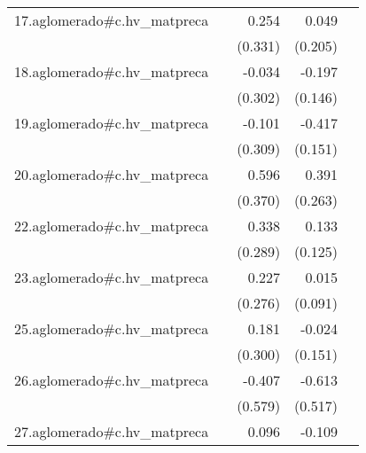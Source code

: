 {\begin{longtable}{l*{4}{D{.}{.}{-1}}}
\addlinespace
17.aglomerado#c.hv\_matpreca&                     &       0.254         &       0.049         &                     \\
            &                     &     (0.331)         &     (0.205)         &                     \\
\addlinespace
18.aglomerado#c.hv\_matpreca&                     &      -0.034         &      -0.197         &                     \\
            &                     &     (0.302)         &     (0.146)         &                     \\
\addlinespace
19.aglomerado#c.hv\_matpreca&                     &      -0.101         &      -0.417\sym{**} &                     \\
            &                     &     (0.309)         &     (0.151)         &                     \\
\addlinespace
20.aglomerado#c.hv\_matpreca&                     &       0.596         &       0.391         &                     \\
            &                     &     (0.370)         &     (0.263)         &                     \\
\addlinespace
22.aglomerado#c.hv\_matpreca&                     &       0.338         &       0.133         &                     \\
            &                     &     (0.289)         &     (0.125)         &                     \\
\addlinespace
23.aglomerado#c.hv\_matpreca&                     &       0.227         &       0.015         &                     \\
            &                     &     (0.276)         &     (0.091)         &                     \\
\addlinespace
25.aglomerado#c.hv\_matpreca&                     &       0.181         &      -0.024         &                     \\
            &                     &     (0.300)         &     (0.151)         &                     \\
\addlinespace
26.aglomerado#c.hv\_matpreca&                     &      -0.407         &      -0.613         &                     \\
            &                     &     (0.579)         &     (0.517)         &                     \\
\addlinespace
27.aglomerado#c.hv\_matpreca&                     &       0.096         &      -0.109\sym{**} &                     \\

\end{longtable}}
